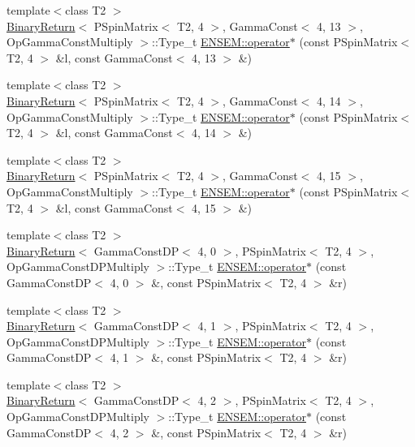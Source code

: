\begin{DoxyCompactItemize}
\item 
{\footnotesize template$<$class T2 $>$ }\\\mbox{\hyperlink{structBinaryReturn}{Binary\+Return}}$<$ P\+Spin\+Matrix$<$ T2, 4 $>$, Gamma\+Const$<$ 4, 13 $>$, Op\+Gamma\+Const\+Multiply $>$\+::Type\+\_\+t \mbox{\hyperlink{group__primspinmatrix_ga144197a9be57f3b174a39c02a6c5e03f}{E\+N\+S\+E\+M\+::operator$\ast$}} (const P\+Spin\+Matrix$<$ T2, 4 $>$ \&l, const Gamma\+Const$<$ 4, 13 $>$ \&)
\item 
{\footnotesize template$<$class T2 $>$ }\\\mbox{\hyperlink{structBinaryReturn}{Binary\+Return}}$<$ P\+Spin\+Matrix$<$ T2, 4 $>$, Gamma\+Const$<$ 4, 14 $>$, Op\+Gamma\+Const\+Multiply $>$\+::Type\+\_\+t \mbox{\hyperlink{group__primspinmatrix_ga45919c652c2dae5905f239b2f35eb67c}{E\+N\+S\+E\+M\+::operator$\ast$}} (const P\+Spin\+Matrix$<$ T2, 4 $>$ \&l, const Gamma\+Const$<$ 4, 14 $>$ \&)
\item 
{\footnotesize template$<$class T2 $>$ }\\\mbox{\hyperlink{structBinaryReturn}{Binary\+Return}}$<$ P\+Spin\+Matrix$<$ T2, 4 $>$, Gamma\+Const$<$ 4, 15 $>$, Op\+Gamma\+Const\+Multiply $>$\+::Type\+\_\+t \mbox{\hyperlink{group__primspinmatrix_ga155437c338ef3cef89bff41046cde747}{E\+N\+S\+E\+M\+::operator$\ast$}} (const P\+Spin\+Matrix$<$ T2, 4 $>$ \&l, const Gamma\+Const$<$ 4, 15 $>$ \&)
\item 
{\footnotesize template$<$class T2 $>$ }\\\mbox{\hyperlink{structBinaryReturn}{Binary\+Return}}$<$ Gamma\+Const\+DP$<$ 4, 0 $>$, P\+Spin\+Matrix$<$ T2, 4 $>$, Op\+Gamma\+Const\+D\+P\+Multiply $>$\+::Type\+\_\+t \mbox{\hyperlink{group__primspinmatrix_ga48316ae1067c59ec664fcd1c4d26042a}{E\+N\+S\+E\+M\+::operator$\ast$}} (const Gamma\+Const\+DP$<$ 4, 0 $>$ \&, const P\+Spin\+Matrix$<$ T2, 4 $>$ \&r)
\item 
{\footnotesize template$<$class T2 $>$ }\\\mbox{\hyperlink{structBinaryReturn}{Binary\+Return}}$<$ Gamma\+Const\+DP$<$ 4, 1 $>$, P\+Spin\+Matrix$<$ T2, 4 $>$, Op\+Gamma\+Const\+D\+P\+Multiply $>$\+::Type\+\_\+t \mbox{\hyperlink{group__primspinmatrix_gaa16aa59946d908b7254dc099e2518fc0}{E\+N\+S\+E\+M\+::operator$\ast$}} (const Gamma\+Const\+DP$<$ 4, 1 $>$ \&, const P\+Spin\+Matrix$<$ T2, 4 $>$ \&r)
\item 
{\footnotesize template$<$class T2 $>$ }\\\mbox{\hyperlink{structBinaryReturn}{Binary\+Return}}$<$ Gamma\+Const\+DP$<$ 4, 2 $>$, P\+Spin\+Matrix$<$ T2, 4 $>$, Op\+Gamma\+Const\+D\+P\+Multiply $>$\+::Type\+\_\+t \mbox{\hyperlink{group__primspinmatrix_gaa8e0559c55ac9cff30b9407943afea03}{E\+N\+S\+E\+M\+::operator$\ast$}} (const Gamma\+Const\+DP$<$ 4, 2 $>$ \&, const P\+Spin\+Matrix$<$ T2, 4 $>$ \&r)

\end{DoxyCompactItemize}
